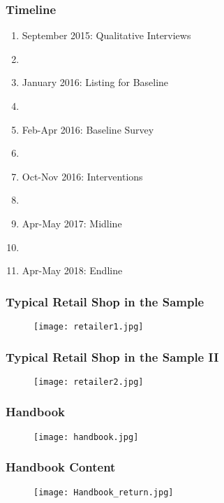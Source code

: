 \documentclass[10pt]{beamer}
\begin{document}
\begin{frame}
\frametitle{Timeline}
\begin{enumerate}
    \item September 2015: \textcolor[rgb]{0.00,0.07,1.00}{Qualitative} Interviews
    \item[]
    \item January 2016: \textcolor[rgb]{0.00,0.07,1.00}{Listing} for Baseline
    \item[]
    \item Feb-Apr 2016: \textcolor[rgb]{0.00,0.07,1.00}{Baseline} Survey
    \item[]
    \item Oct-Nov 2016: \textcolor[rgb]{0.00,0.07,1.00}{Interventions}
    \item[]
    \item Apr-May 2017: \textcolor[rgb]{0.00,0.07,1.00}{Midline}
    \item[]
    \item Apr-May 2018: \textcolor[rgb]{0.00,0.07,1.00}{Endline}
\end{enumerate}
\end{frame}


\begin{frame}
\frametitle{Typical Retail Shop in the Sample}

\begin{figure}[htbp]
	\centering
		\texttt{[image: retailer1.jpg]}
	\label{height}
\end{figure}
\end{frame}

\begin{frame}
\frametitle{Typical Retail Shop in the Sample II}

\begin{figure}[htbp]
	\centering
		\texttt{[image: retailer2.jpg]}
	\label{height}
\end{figure}
\end{frame}


\begin{frame}
\frametitle{Handbook}

\begin{figure}[htbp]
	\centering
		\texttt{[image: handbook.jpg]}
	
	\label{height}
\end{figure}
\end{frame}


\begin{frame}
\frametitle{Handbook Content}
\begin{figure}[htbp]
	\centering
		\texttt{[image: Handbook\_return.jpg]}
	
	\label{height}
\end{figure}
\end{frame}
\end{document}
